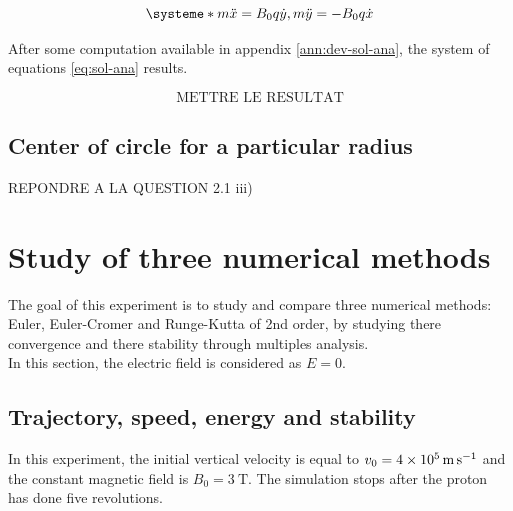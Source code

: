 \documentclass[a4paper,12pt,twoside]{article}
\begin{document}
\begin{equation}
\systeme*{m\ddot{x} = B_0q\dot{y}, m\ddot{y} = - B_0q\dot{x}}
\label{eq:equa-diff-simple}
\end{equation}

After some computation available in appendix \ref{ann:dev-sol-ana}, the system of equations \ref{eq:sol-ana} results.

\begin{equation}
\text{METTRE LE RESULTAT}
\label{eq:sol-ana}
\end{equation}%

\subsection{Center of circle for a particular radius}
REPONDRE A LA QUESTION 2.1 iii)

\section{Study of three numerical methods}\label{sec:etudes-integrateur}
The goal of this experiment is to study and compare three numerical methods: Euler, Euler-Cromer and Runge-Kutta of 2nd order, by studying there convergence and there stability through multiples analysis.\\
In this section, the electric field is considered as $E = 0$. 
\subsection{Trajectory, speed, energy and stability}
In this experiment, the initial vertical velocity is equal to $v_0 = \SI{4d5}{\meter\per\second}$ and the constant magnetic field is $B_0 = \SI{3}{\tesla}$.
The simulation stops after the proton has done five revolutions.
\end{document}
